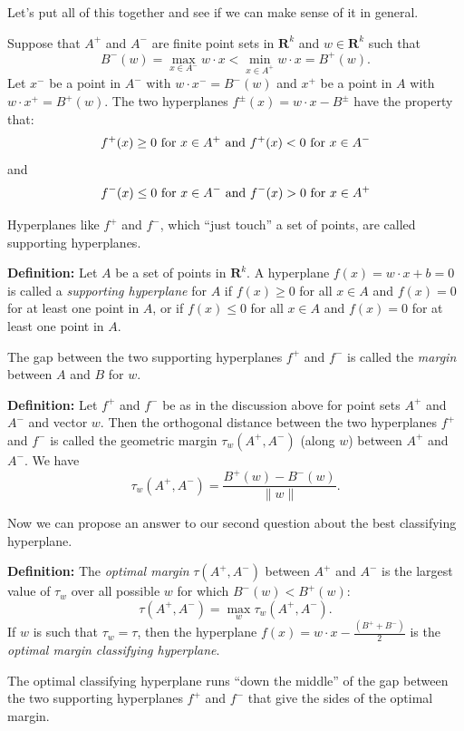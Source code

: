 \documentclass[
  11pt,
  letterpaper,
]{scrbook}
\theoremstyle{plain}
\theoremstyle{plain}
\theoremstyle{remark}
\begin{document}
Let's put all of this together and see if we can make sense of it in
general.

Suppose that \(A^{+}\) and \(A^{-}\) are finite point sets in
\(\mathbf{R}^{k}\) and \(w\in\mathbf{R}^{k}\) such that \[
B^{-}(w)=\max_{x\in A^{-}}w\cdot x < \min_{x\in A^{+}}w\cdot x=B^{+}(w).
\] Let \(x^{-}\) be a point in \(A^{-}\) with \(w\cdot x^{-}=B^{-}(w)\)
and \(x^{+}\) be a point in \(A\) with \(w\cdot x^{+}=B^{+}(w)\). The
two hyperplanes \(f^{\pm}(x) = w\cdot x - B^{\pm}\) have the property
that: \[
f^{+}(x)\ge 0\hbox{ for }x\in A^{+}\hbox{ and }f^{+}(x)<0\hbox{ for }x\in A^{-}
\] and \[
f^{-}(x)\le 0\hbox{ for }x\in A^{-}\hbox{ and }f^{-}(x)>0\hbox{ for }x\in A^{+}
\]

Hyperplanes like \(f^{+}\) and \(f^{-}\), which ``just touch'' a set of
points, are called supporting hyperplanes.

\textbf{Definition:} Let \(A\) be a set of points in \(\mathbf{R}^{k}\).
A hyperplane \(f(x)=w\cdot x+b=0\) is called a \emph{supporting
hyperplane} for \(A\) if \(f(x)\ge 0\) for all \(x\in A\) and \(f(x)=0\)
for at least one point in \(A\), or if \(f(x)\le 0\) for all \(x\in A\)
and \(f(x)=0\) for at least one point in \(A\).

The gap between the two supporting hyperplanes \(f^{+}\) and \(f^{-}\)
is called the \emph{margin} between \(A\) and \(B\) for \(w\).

\textbf{Definition:} Let \(f^{+}\) and \(f^{-}\) be as in the discussion
above for point sets \(A^{+}\) and \(A^{-}\) and vector \(w\). Then the
orthogonal distance between the two hyperplanes \(f^{+}\) and \(f^{-}\)
is called the geometric margin \(\tau_{w}(A^{+},A^{-})\) (along \(w\))
between \(A^{+}\) and \(A^{-}\). We have \[
\tau_{w}(A^{+},A^{-})=\frac{B^{+}(w)-B^{-}(w)}{\|w\|}.
\]

Now we can propose an answer to our second question about the best
classifying hyperplane.

\textbf{Definition:} The \emph{optimal margin} \(\tau(A^{+},A^{-})\)
between \(A^{+}\) and \(A^{-}\) is the largest value of \(\tau_{w}\)
over all possible \(w\) for which \(B^{-}(w)<B^{+}(w)\): \[
\tau(A^{+},A^{-}) = \max_{w} \tau_{w}(A^{+},A^{-}).
\] If \(w\) is such that \(\tau_{w}=\tau\), then the hyperplane
\(f(x)=w\cdot x - \frac{(B^{+}+B^{-})}{2}\) is the \emph{optimal margin
classifying hyperplane}.

The optimal classifying hyperplane runs ``down the middle'' of the gap
between the two supporting hyperplanes \(f^{+}\) and \(f^{-}\) that give
the sides of the optimal margin.
\end{document}
